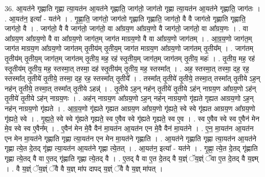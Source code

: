 \documentclass[17pt]{extarticle}
\begin{document}
36. आ॒यत॑ने गृह्णाति गृह्णा त्या॒यत॑न आ॒यत॑ने गृह्णाति॒ जाग॑तो॒ जाग॑तो गृह्णा त्या॒यत॑न आ॒यत॑ने गृह्णाति॒ जाग॑तः । . आ॒यत॑न॒ इत्या᳚ - यत॑ने । . गृ॒ह्णा॒ति॒ जाग॑तो॒ जाग॑तो गृह्णाति गृह्णाति॒ जाग॑तो॒ वै वै जाग॑तो गृह्णाति गृह्णाति॒ जाग॑तो॒ वै । . जाग॑तो॒ वै वै जाग॑तो॒ जाग॑तो॒ वा आ᳚ग्रय॒ण आ᳚ग्रय॒णो वै जाग॑तो॒ जाग॑तो॒ वा आ᳚ग्रय॒णः । . वा आ᳚ग्रय॒ण आ᳚ग्रय॒णो वै वा आ᳚ग्रय॒णो जाग॑त॒म् जाग॑त माग्रय॒णो वै वा आ᳚ग्रय॒णो जाग॑तम् । . आ॒ग्र॒य॒णो जाग॑त॒म् जाग॑त माग्रय॒ण आ᳚ग्रय॒णो जाग॑तम् तृ॒तीय॑म् तृ॒तीय॒म् जाग॑त माग्रय॒ण आ᳚ग्रय॒णो जाग॑तम् तृ॒तीय᳚म् । . जाग॑तम् तृ॒तीय॑म् तृ॒तीय॒म् जाग॑त॒म् जाग॑तम् तृ॒तीय॒ मह॒ रह॑ स्तृ॒तीय॒म् जाग॑त॒म् जाग॑तम् तृ॒तीय॒ महः॑ । . तृ॒तीय॒ मह॒ रह॑ स्तृ॒तीय॑म् तृ॒तीय॒ मह॒ स्तस्मा॒त् तस्मा॒ दह॑ स्तृ॒तीय॑म् तृ॒तीय॒ मह॒ स्तस्मा᳚त् । . अह॒ स्तस्मा॒त् तस्मा॒ दह॒ रह॒ स्तस्मा᳚त् तृ॒तीये॑ तृ॒तीये॒ तस्मा॒ दह॒ रह॒ स्तस्मा᳚त् तृ॒तीये᳚ । . तस्मा᳚त् तृ॒तीये॑ तृ॒तीये॒ तस्मा॒त् तस्मा᳚त् तृ॒तीये ऽह॒न् नह॑न् तृ॒तीये॒ तस्मा॒त् तस्मा᳚त् तृ॒तीये ऽहन्न्॑ । . तृ॒तीये ऽह॒न् नह॑न् तृ॒तीये॑ तृ॒तीये ऽह॑न् नाग्रय॒ण आ᳚ग्रय॒णो ऽह॑न् तृ॒तीये॑ तृ॒तीये ऽह॑न् नाग्रय॒णः । . अह॑न् नाग्रय॒ण आ᳚ग्रय॒णो ऽह॒न् नह॑न् नाग्रय॒णो गृ॑ह्यते गृह्यत आग्रय॒णो ऽह॒न् नह॑न् नाग्रय॒णो गृ॑ह्यते । . आ॒ग्र॒य॒णो गृ॑ह्यते गृह्यत आग्रय॒ण आ᳚ग्रय॒णो गृ॑ह्यते॒ स्वे स्वे गृ॑ह्यत आग्रय॒ण आ᳚ग्रय॒णो गृ॑ह्यते॒ स्वे । . गृ॒ह्य॒ते॒ स्वे स्वे गृ॑ह्यते गृह्यते॒ स्व ए॒वैव स्वे गृ॑ह्यते गृह्यते॒ स्व ए॒व । . स्व ए॒वैव स्वे स्व ए॒वैन॑ मेन मे॒व स्वे स्व ए॒वैन᳚म् । . ए॒वैन॑ मेन मे॒वै वैन॑ मा॒यत॑न आ॒यत॑न एन मे॒वै वैन॑ मा॒यत॑ने । . ए॒न॒ मा॒यत॑न आ॒यत॑न एन मेन मा॒यत॑ने गृह्णाति गृह्णा त्या॒यत॑न एन मेन मा॒यत॑ने गृह्णाति । . आ॒यत॑ने गृह्णाति गृह्णा त्या॒यत॑न आ॒यत॑ने गृह्णा त्ये॒त दे॒तद् गृ॑ह्णा त्या॒यत॑न आ॒यत॑ने गृह्णा त्ये॒तत् । . आ॒यत॑न॒ इत्या᳚ - यत॑ने । . गृ॒ह्णा॒ त्ये॒त दे॒तद् गृ॑ह्णाति गृह्णा त्ये॒तद् वै वा ए॒तद् गृ॑ह्णाति गृह्णा त्ये॒तद् वै । . ए॒तद् वै वा ए॒त दे॒तद् वै य॒ज्ञ्ं ॅय॒ज्ञ्ं ॅवा ए॒त दे॒तद् वै य॒ज्ञ्म् । . वै य॒ज्ञ्ं ॅय॒ज्ञ्ं ॅवै वै य॒ज्ञ् मा॑प दापद् य॒ज्ञ्ं ॅवै वै य॒ज्ञ् मा॑पत् । \newline
\pagebreak
{}
\end{document}

